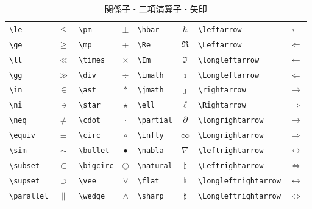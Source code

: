 \begin{table}[htbp]
\begin{center}
\caption{関係子・二項演算子・矢印}
\label{tab:misc}
\begin{tabular}{lc|lc|lc|lc}
 \verb+\le+    & $\le$    & \verb+\pm+     & $\pm$     & \verb+\hbar+    &
 $\hbar$  & \verb+\leftarrow+ & $\leftarrow$ \\
 \verb+\ge+    & $\ge$    & \verb+\mp+     & $\mp$     & \verb+\Re+      &
 $\Re$  & \verb+\Leftarrow+ & $\Leftarrow$\\
 \verb+\ll+    & $\ll$    & \verb+\times+  & $\times$  & \verb+\Im+      &
 $\Im$   & \verb+\longleftarrow+ & $\longleftarrow$ \\
 \verb+\gg+    & $\gg$    & \verb+\div+    & $\div$    & \verb+\imath+   &
 $\imath$  & \verb+\Longleftarrow+ & $\Longleftarrow$\\
 \verb+\in+    & $\in$    & \verb+\ast+    & $\ast$    & \verb+\jmath+   &
 $\jmath$ & \verb+\rightarrow+ & $\rightarrow$ \\
 \verb+\ni+    & $\ni$    & \verb+\star+   & $\star$   & \verb+\ell+     &
 $\ell$ & \verb+\Rightarrow+ & $\Rightarrow$  \\
 \verb+\neq+   & $\neq$   & \verb+\cdot+   & $\cdot$   & \verb+\partial+ &
 $\partial$ & \verb+\longrightarrow+ & $\longrightarrow$ \\
 \verb+\equiv+ & $\equiv$ & \verb+\circ+   & $\circ$   & \verb+\infty+   &
 $\infty$ & \verb+\Longrightarrow+ & $\Longrightarrow$  \\
 \verb+\sim+   & $\sim$   & \verb+\bullet+ & $\bullet$ & \verb+\nabla+   &
 $\nabla$ & \verb+\leftrightarrow+ & $\leftrightarrow$ \\
 \verb+\subset+ & $\subset$ & \verb+\bigcirc+ & $\bigcirc$ & \verb+\natural+ &
 $\natural$ & \verb+\Leftrightarrow+ & $\Leftrightarrow$ \\
 \verb+\supset+ & $\supset$ & \verb+\vee+ & $\vee$ & \verb+\flat+ & $\flat$  &
 \verb+\longleftrightarrow+ & $\longleftrightarrow$ \\
 \verb+\parallel+ & $\parallel$ & \verb+\wedge+ & $\wedge$ & \verb+\sharp+ &
 $\sharp$ & \verb+\Longleftrightarrow+ & $\Longleftrightarrow$
\end{tabular}
\end{center}
\end{table}

